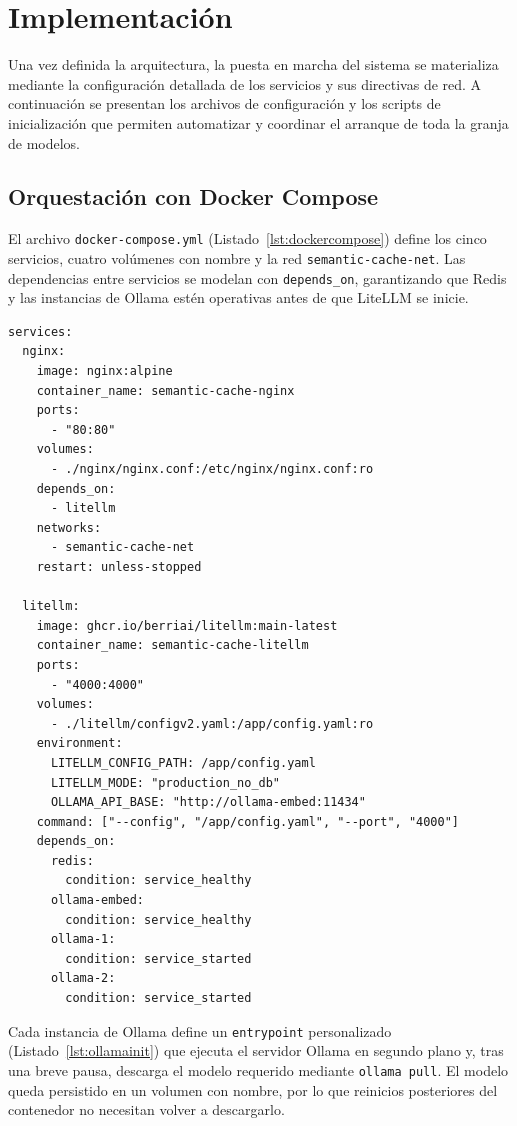 \newpage
\section{Implementación}

Una vez definida la arquitectura, la puesta en marcha del sistema se materializa mediante la configuración detallada de los servicios y sus directivas de red. A continuación se presentan los archivos de configuración y los scripts de inicialización que permiten automatizar y coordinar el arranque de toda la granja de modelos.

\subsection{Orquestación con Docker Compose}

El archivo \texttt{docker-compose.yml} (Listado~\ref{lst:dockercompose}) define los cinco servicios, cuatro volúmenes con nombre y la red \texttt{semantic-cache-net}. Las dependencias entre servicios se modelan con \texttt{depends\_on}, garantizando que Redis y las instancias de Ollama estén operativas antes de que LiteLLM se inicie.

\lstset{caption=Definición de servicios en docker-compose.yml, label=lst:dockercompose}
\begin{lstlisting}[language=docker-compose]
services:
  nginx:
    image: nginx:alpine
    container_name: semantic-cache-nginx
    ports:
      - "80:80"
    volumes:
      - ./nginx/nginx.conf:/etc/nginx/nginx.conf:ro
    depends_on:
      - litellm
    networks:
      - semantic-cache-net
    restart: unless-stopped

  litellm:
    image: ghcr.io/berriai/litellm:main-latest
    container_name: semantic-cache-litellm
    ports:
      - "4000:4000"
    volumes:
      - ./litellm/configv2.yaml:/app/config.yaml:ro
    environment:
      LITELLM_CONFIG_PATH: /app/config.yaml
      LITELLM_MODE: "production_no_db"
      OLLAMA_API_BASE: "http://ollama-embed:11434"
    command: ["--config", "/app/config.yaml", "--port", "4000"]
    depends_on:
      redis:
        condition: service_healthy
      ollama-embed:
        condition: service_healthy
      ollama-1:
        condition: service_started
      ollama-2:
        condition: service_started
\end{lstlisting}

Cada instancia de Ollama define un \texttt{entrypoint} personalizado (Listado~\ref{lst:ollamainit}) que ejecuta el servidor Ollama en segundo plano y, tras una breve pausa, descarga el modelo requerido mediante \texttt{ollama pull}. El modelo queda persistido en un volumen con nombre, por lo que reinicios posteriores del contenedor no necesitan volver a descargarlo.

